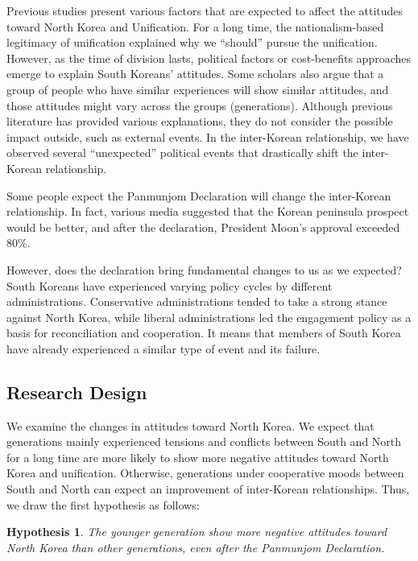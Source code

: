 \documentclass[letterpaper,10pt,twocolumn,twoside,]{pinp}
\newtheorem{hyp}{Hypothesis}
\begin{document}
Previous studies present various factors that are expected to affect the
attitudes toward North Korea and Unification. For a long time, the
nationalism-based legitimacy of unification explained why we ``should''
pursue the unification. However, as the time of division lasts,
political factors or cost-benefits approaches emerge to explain South
Koreans' attitudes. Some scholars also argue that a group of people who
have similar experiences will show similar attitudes, and those
attitudes might vary across the groups (generations). Although previous
literature has provided various explanations, they do not consider the
possible impact outside, such as external events. In the inter-Korean
relationship, we have observed several ``unexpected'' political events
that drastically shift the inter-Korean relationship.

Some people expect the Panmunjom Declaration will change the
inter-Korean relationship. In fact, various media suggested that the
Korean peninsula prospect would be better, and after the declaration,
President Moon's approval exceeded 80\%.

However, does the declaration bring fundamental changes to us as we
expected? South Koreans have experienced varying policy cycles by
different administrations. Conservative administrations tended to take a
strong stance against North Korea, while liberal administrations led the
engagement policy as a basis for reconciliation and cooperation. It
means that members of South Korea have already experienced a similar
type of event and its failure.

\hypertarget{research-design}{%
\subsection{Research Design}\label{research-design}}

We examine the changes in attitudes toward North Korea. We expect that
generations mainly experienced tensions and conflicts between South and
North for a long time are more likely to show more negative attitudes
toward North Korea and unification. Otherwise, generations under
cooperative moods between South and North can expect an improvement of
inter-Korean relationships. Thus, we draw the first hypothesis as
follows:

\begin{hyp}\label{hyp1} The younger generation show more negative attitudes toward North Korea than other generations, even after the Panmunjom Declaration. \end{hyp}
\end{document}
